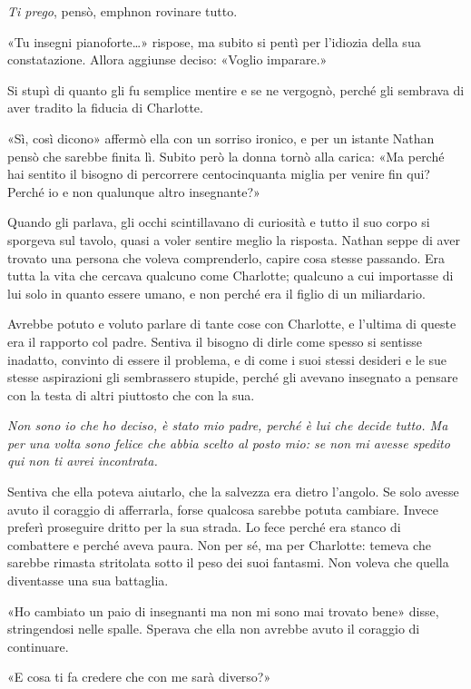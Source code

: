 \documentclass[a4paper,oneside,11pt]{memoir}
\begin{document}
\emph{Ti prego}, pensò, emph{non rovinare tutto}.

«Tu insegni pianoforte\dots{}» rispose, ma subito si pentì per l'idiozia della
sua constatazione. Allora aggiunse deciso: «Voglio imparare.»

Si stupì di quanto gli fu semplice mentire e se ne vergognò, perché gli sembrava
di aver tradito la fiducia di Charlotte.

«Sì, così dicono» affermò ella con un sorriso ironico, e per un istante Nathan
pensò che sarebbe finita lì. Subito però la donna tornò alla carica: «Ma perché
hai sentito il bisogno di percorrere centocinquanta miglia per venire fin qui?
Perché io e non qualunque altro insegnante?»

Quando gli parlava, gli occhi scintillavano di curiosità e tutto il suo corpo si
sporgeva sul tavolo, quasi a voler sentire meglio la risposta. Nathan seppe di
aver trovato una persona che voleva comprenderlo, capire cosa stesse passando.
Era tutta la vita che cercava qualcuno come Charlotte; qualcuno a cui importasse
di lui solo in quanto essere umano, e non perché era il figlio di un
miliardario.

Avrebbe potuto e voluto parlare di tante cose con Charlotte, e l'ultima di
queste era il rapporto col padre. Sentiva il bisogno di dirle come spesso si
sentisse inadatto, convinto di essere il problema, e di come i suoi stessi
desideri e le sue stesse aspirazioni gli sembrassero stupide, perché gli avevano
insegnato a pensare con la testa di altri piuttosto che con la sua.

\emph{Non sono io che ho deciso, è stato mio padre, perché è lui che decide
tutto. Ma per una volta sono felice che abbia scelto al posto mio: se non mi
avesse spedito qui non ti avrei incontrata.}

Sentiva che ella poteva aiutarlo, che la salvezza era dietro l'angolo. Se solo
avesse avuto il coraggio di afferrarla, forse qualcosa sarebbe potuta cambiare.
Invece preferì proseguire dritto per la sua strada. Lo fece perché era stanco di
combattere e perché aveva paura. Non per sé, ma per Charlotte: temeva che
sarebbe rimasta stritolata sotto il peso dei suoi fantasmi. Non voleva che
quella diventasse una sua battaglia.

«Ho cambiato un paio di insegnanti ma non mi sono mai trovato bene» disse,
stringendosi nelle spalle. Sperava che ella non avrebbe avuto il coraggio di
continuare.

«E cosa ti fa credere che con me sarà diverso?»
\end{document}
